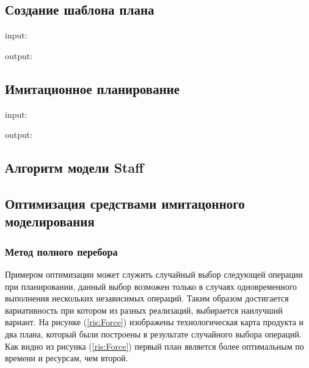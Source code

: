 \subsection{Создание шаблона плана}


input:

output:

\subsection{Имитационное планирование}

input:

output:

\subsection{Алгоритм модели Staff}

\subsection{Оптимизация средствами имитацонного моделирования}

\subsubsection{Метод полного перебора}
Примером оптимизации может служить случайный выбор следующей операции при планировании, данный выбор возможен только в случаях одновременного выполнения нескольких независимых операций. Таким образом достигается вариативность при котором из разных реализаций, выбирается наилучший вариант. На рисунке (\ref{ris:Force}) изображены технологическая карта продукта и два плана, который были построены в результате случайного выбора операций. Как видно из рисунка (\ref{ris:Force}) первый план является более оптимальным по времени и ресурсам, чем второй.

